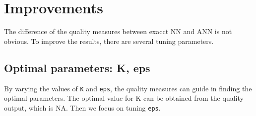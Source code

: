 \documentclass[11pt,a4paper,]{article}
\begin{document}
\hypertarget{improvements}{%
\section{Improvements}\label{improvements}}

The difference of the quality measures between exacct NN and ANN is not obvious. To improve the results, there are several tuning parameters.

\hypertarget{optimal-parameters-k-eps}{%
\subsection{Optimal parameters: K, eps}\label{optimal-parameters-k-eps}}

By varying the values of \texttt{K} and \texttt{eps}, the quality measures can guide in finding the optimal parameters. The optimal value for K can be obtained from the quality output, which is NA. Then we focus on tuning \texttt{eps}.
\end{document}
